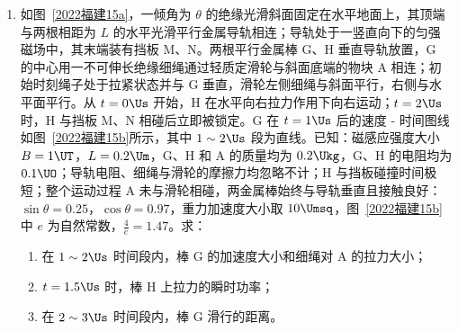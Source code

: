 \documentclass[\gkver]{gaokaozhenti}
\begin{document}
\begin{enumerate}
\item
如图~\ref{2022福建15a}，一倾角为 $\theta$ 的绝缘光滑斜面固定在水平地面上，其顶端与两根相距为 $L$ 的水平光滑平行金属导轨相连；导轨处于一竖直向下的匀强磁场中，其末端装有挡板 M、N。两根平行金属棒 G、H 垂直导轨放置，G 的中心用一不可伸长绝缘细绳通过轻质定滑轮与斜面底端的物块 A 相连；初始时刻绳子处于拉紧状态并与 G 垂直，滑轮左侧细绳与斜面平行，右侧与水平面平行。从 $t=0\Us$ 开始，H 在水平向右拉力作用下向右运动；$t=2\Us$ 时，H 与挡板 M、N 相碰后立即被锁定。G 在 $t=1\Us$ 后的速度 - 时间图线如图~\ref{2022福建15b}所示，其中 $1\sim2\Us$ 段为直线。已知：磁感应强度大小 $B=1\UT$，$L=0.2\Um$，G、H 和 A 的质量均为 $0.2\Ukg$，G、H 的电阻均为 $0.1\UO$；导轨电阻、细绳与滑轮的摩擦力均忽略不计；H 与挡板碰撞时间极短；整个运动过程 A 未与滑轮相碰，两金属棒始终与导轨垂直且接触良好：$\sin\theta=0.25$，$\cos\theta=0.97$，重力加速度大小取 $10\Umsq$，图~\ref{2022福建15b}中 $e$ 为自然常数，$\frac{4}{e}=1.47$。求：

\begin{enumerate}
	\item
	在 $1\sim2\Us$ 时间段内，棒 G 的加速度大小和细绳对 A 的拉力大小；
	\item
	$t=1.5\Us$ 时，棒 H 上拉力的瞬时功率；
	\item
	在 $2\sim3\Us$ 时间段内，棒 G 滑行的距离。
\end{enumerate}


\end{enumerate}
\end{document}
